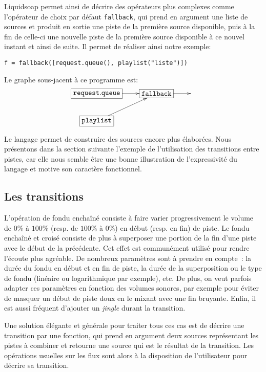 \documentclass[twoside]{article}
\newcommand{\liquidsoap}{Liquidsoap}
\theoremstyle{plain}
\theoremstyle{definition}
\theoremstyle{remark}
\begin{document}
\liquidsoap{} permet ainsi de décrire des opérateurs plus complexes comme
l'opérateur de choix par défaut \texttt{fallback},
qui prend en argument une liste
de sources et produit en sortie une piste de la première source disponible,
puis à la fin de celle-ci une nouvelle piste de la première source disponible
à ce nouvel instant et ainsi de suite. Il permet de réaliser ainsi notre exemple:
\begin{verbatim}
f = fallback([request.queue(), playlist("liste")])
\end{verbatim}
Le graphe sous-jacent à ce programme est:
\[
\xymatrix{
  *+[F]{\mathtt{request.queue}}\ar[r]&*+[F]{\mathtt{fallback}}\ar[r]&\\
  *+[F]{\mathtt{playlist}}\ar[ur]&\\
}
\]

Le langage permet de construire des sources encore plus élaborées. Nous
présentons dans la section suivante l'exemple de l'utilisation des transitions
entre pistes, car elle nous semble être une bonne illustration de l'expressivité
du langage et motive son caractère fonctionnel.

\subsection{Les transitions}
\label{section:transitions}
L'opération de fondu enchaîné consiste à faire varier progressivement le volume
de $0\%$ à $100\%$ (resp. de $100\%$ à $0\%$) en début (resp. en fin) de
piste. Le fondu enchaîné et croisé consiste de plus à superposer une portion de
la fin d'une piste avec le début de la précédente. Cet effet est communément
utilisé pour rendre l'écoute plus agréable. De nombreux paramètres sont à
prendre en compte~: la durée du fondu en début et en fin de piste, la durée de
la superposition ou le type de fondu (linéaire ou logarithmique par exemple),
etc. De plus, on veut parfois adapter ces paramètres en fonction des volumes
sonores, par exemple pour éviter de masquer un début de piste doux en le mixant
avec une fin bruyante. Enfin, il est aussi fréquent d'ajouter un \emph{jingle}
durant la transition.

Une solution élégante et générale pour traiter tous ces cas est de décrire une
transition par une fonction, qui prend en argument deux sources représentant les
pistes à combiner et retourne une source qui est le résultat de la
transition. Les opérations usuelles sur les flux sont alors à la disposition de
l'utilisateur pour décrire sa transition.
\end{document}
